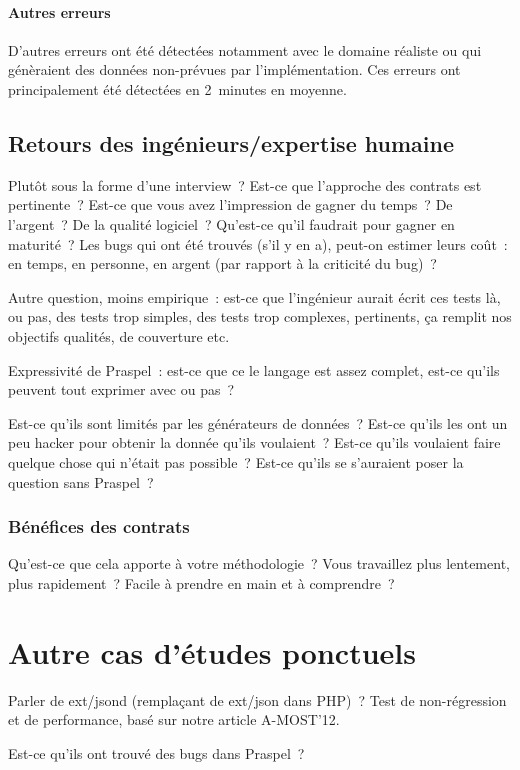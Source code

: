 \paragraph{Autres erreurs} D'autres erreurs ont été détectées notamment avec le
domaine réaliste  ou  qui génèraient des données
non-prévues par l'implémentation. Ces erreurs ont principalement été détectées
en 2~minutes en moyenne.

\subsection{Retours des ingénieurs/expertise humaine}

Plutôt sous la forme d'une interview~? Est-ce que l'approche des contrats est
pertinente~? Est-ce que vous avez l'impression de gagner du temps~? De
l'argent~? De la qualité logiciel~? Qu'est-ce qu'il faudrait pour gagner en
maturité~? Les bugs qui ont été trouvés (s'il y en a), peut-on estimer leurs
coût~: en temps, en personne, en argent (par rapport à la criticité du bug)~?

Autre question, moins empirique~: est-ce que l'ingénieur aurait écrit ces tests
là, ou pas, des tests trop simples, des tests trop complexes, pertinents, ça
remplit nos objectifs qualités, de couverture etc.

Expressivité de Praspel~: est-ce que ce le langage est assez complet, est-ce
qu'ils peuvent tout exprimer avec ou pas~?

Est-ce qu'ils sont limités par les générateurs de données~? Est-ce qu'ils les
ont un peu hacker pour obtenir la donnée qu'ils voulaient~? Est-ce qu'ils
voulaient faire quelque chose qui n'était pas possible~? Est-ce qu'ils se
s'auraient poser la question sans Praspel~?

\subsubsection{Bénéfices des contrats}

Qu'est-ce que cela apporte à votre méthodologie~? Vous travaillez plus
lentement, plus rapidement~? Facile à prendre en main et à comprendre~?

\section{Autre cas d'études ponctuels}

Parler de ext/jsond (remplaçant de ext/json dans PHP)~? Test de non-régression
et de performance, basé sur notre article A-MOST'12.

Est-ce qu'ils ont trouvé des bugs dans Praspel~?

